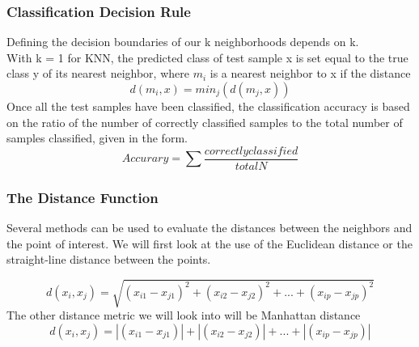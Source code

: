 \documentclass{report}
\begin{document}
\subsubsection*{Classification Decision Rule}
Defining the decision boundaries of our k neighborhoods depends on k.
\\
With k = 1 for KNN, the predicted class of test sample x is set equal to the true class y of its nearest neighbor, where $m_{i}$ is a nearest neighbor to x if the distance \cite{7}
\begin{equation}
d(m_{i},x) = min_{j}(d(m_{j},x))
\end{equation} 
Once all the test samples have been classified, the classification accuracy is based on the ratio of the number of correctly classified samples to the total number of samples classified, given in the form.
\begin{equation}
Accurary = \sum \frac{correctly classified}{total N}
\end{equation}
		


\subsubsection*{The Distance Function}

Several methods can be used to evaluate the distances between the neighbors and the point of interest.
We will first look at the use of the Euclidean distance or the straight-line distance between the points.

\begin{equation}
d(x_{i},x_{j}) = \sqrt{(x_{i1} - x_{j1})^2 + (x_{i2} - x_{j2})^2 + ... + (x_{ip} - x_{jp})^2}
\end{equation}
The other distance metric we will look into will be Manhattan distance
\begin{equation}
d(x_{i},x_{j}) = |(x_{i1} - x_{j1})| + |(x_{i2} - x_{j2})| + ... + |(x_{ip} - x_{jp})|
\end{equation}



\end{document}
